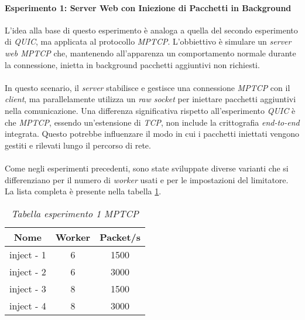 \paragraph{Esperimento 1: Server Web con Iniezione di Pacchetti in Background}
L'idea alla base di questo esperimento è analoga a quella del secondo esperimento di \emph{QUIC}, ma applicata al protocollo \emph{MPTCP}. 
L'obbiettivo è simulare un \emph{server web MPTCP} che, mantenendo all'apparenza un comportamento normale durante la connessione, inietta in background pacchetti aggiuntivi non richiesti.
\\\\
In questo scenario, il \emph{server} stabilisce e gestisce una connessione \emph{MPTCP} con il \emph{client}, ma parallelamente utilizza un \emph{raw socket} per iniettare pacchetti aggiuntivi nella comunicazione.
Una differenza significativa rispetto all'esperimento \emph{QUIC} è che \emph{MPTCP}, essendo un'estensione di \emph{TCP}, non include la crittografia \emph{end-to-end} integrata. 
Questo potrebbe influenzare il modo in cui i pacchetti iniettati vengono gestiti e rilevati lungo il percorso di rete.
\\\\
Come negli esperimenti precedenti, sono state sviluppate diverse varianti che si differenziano per il numero di \emph{worker} usati e per le impostazioni del limitatore. 
La lista completa è presente nella tabella \ref{table-inject-MPTCP}.
\begin{table}[!h]
    \centering
    \begin{tabular}{|c|c|c|}
        \hline
        \textbf{Nome} & \textbf{Worker} & \textbf{Packet/s} \\
        \hline
        inject - 1  & 6 & 1500 \\
        \hline
        inject - 2 & 6 & 3000 \\
        \hline
        inject - 3 & 8 & 1500 \\
        \hline
        inject - 4 & 8 & 3000 \\
        \hline
    \end{tabular}
    \caption{\emph{Tabella esperimento 1 MPTCP}}
    \label{table-inject-MPTCP}
\end{table}
